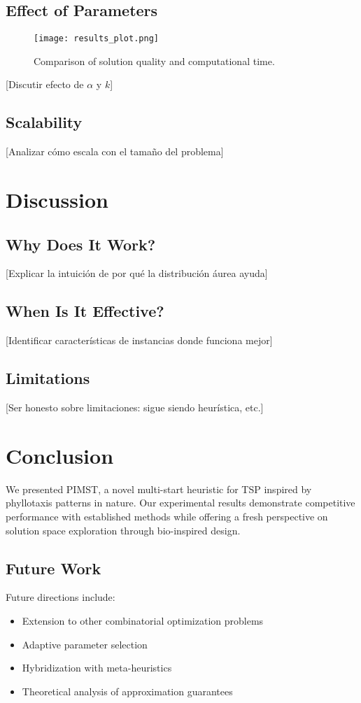 \documentclass[conference]{IEEEtran}
\begin{document}
\subsection{Effect of Parameters}
\begin{figure}[t]
\centering
\texttt{[image: results\_plot.png]}
\caption{Comparison of solution quality and computational time.}
\label{fig:comparison}
\end{figure}

[Discutir efecto de $\alpha$ y $k$]

\subsection{Scalability}
[Analizar cómo escala con el tamaño del problema]

\section{Discussion}

\subsection{Why Does It Work?}
[Explicar la intuición de por qué la distribución áurea ayuda]

\subsection{When Is It Effective?}
[Identificar características de instancias donde funciona mejor]

\subsection{Limitations}
[Ser honesto sobre limitaciones: sigue siendo heurística, etc.]

\section{Conclusion}
We presented PIMST, a novel multi-start heuristic for TSP inspired by phyllotaxis patterns in nature. Our experimental results demonstrate competitive performance with established methods while offering a fresh perspective on solution space exploration through bio-inspired design.

\subsection{Future Work}
Future directions include:
\begin{itemize}
\item Extension to other combinatorial optimization problems
\item Adaptive parameter selection
\item Hybridization with meta-heuristics
\item Theoretical analysis of approximation guarantees
\end{itemize}
\end{document}
